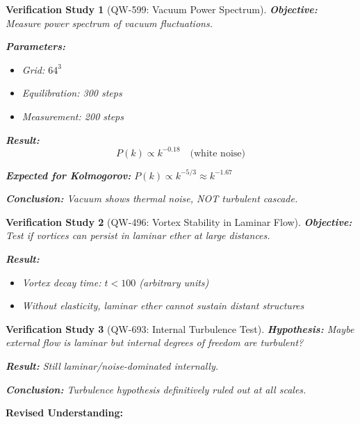 \documentclass[11pt,a4paper]{book}
\newtheorem{verification}{Verification Study}[section]
\theoremstyle{remark}
\begin{document}
\begin{verification}[QW-599: Vacuum Power Spectrum]
\textbf{Objective:} Measure power spectrum of vacuum fluctuations.

\textbf{Parameters:}
\begin{itemize}
    \item Grid: $64^3$
    \item Equilibration: 300 steps
    \item Measurement: 200 steps
\end{itemize}

\textbf{Result:}
\begin{equation}
P(k) \propto k^{-0.18} \quad \text{(white noise)}
\end{equation}

\textbf{Expected for Kolmogorov:} $P(k) \propto k^{-5/3} \approx k^{-1.67}$

\textbf{Conclusion:} Vacuum shows thermal noise, NOT turbulent cascade.
\end{verification}

\begin{verification}[QW-496: Vortex Stability in Laminar Flow]
\textbf{Objective:} Test if vortices can persist in laminar ether at large distances.

\textbf{Result:}
\begin{itemize}
    \item Vortex decay time: $t < 100$ (arbitrary units)
    \item Without elasticity, laminar ether cannot sustain distant structures
\end{itemize}
\end{verification}

\begin{verification}[QW-693: Internal Turbulence Test]
\textbf{Hypothesis:} Maybe external flow is laminar but internal degrees of freedom are turbulent?

\textbf{Result:} Still laminar/noise-dominated internally.

\textbf{Conclusion:} Turbulence hypothesis definitively ruled out at all scales.
\end{verification}

\textbf{Revised Understanding:}
\begin{center}
\end{center}
\end{document}
